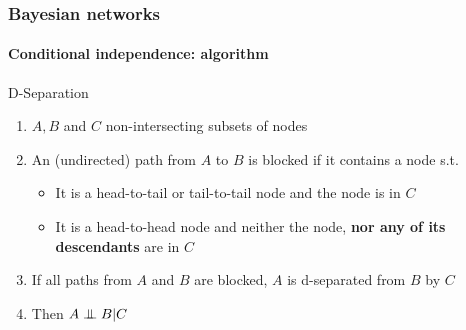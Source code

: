 \documentclass[slidestop,compress,mathserif]{beamer}
\newcommand{\indep}{\ensuremath{\perp\mkern -10mu \perp}}
\begin{document}
\begin{frame}
	\frametitle{Bayesian networks}
	\framesubtitle{Conditional independence: algorithm}
    \vspace{-.5cm}
    \begin{block}{D-Separation}
    \begin{enumerate}
    \item $A,B$ and $C$ non-intersecting subsets of nodes
    \item An (undirected) path from $A$ to $B$ is blocked if it contains
    a node s.t.
    \begin{itemize}
    \item It is a head-to-tail or tail-to-tail node and
    the node is in $C$
    \item It is a head-to-head node and neither the node,
    \textbf{nor any of its descendants} are in $C$
    \end{itemize}
    \item If all paths from $A$ and $B$ are blocked,
    $A$ is d-separated from $B$ by $C$
    \item Then $A \indep B | C$
    \end{enumerate}
    \end{block}
\end{frame}
\end{document}

